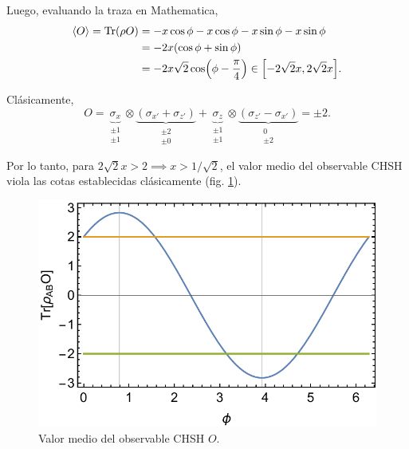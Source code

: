 \documentclass{scrartcl}
\DeclareRobustCommand{\[}{\begin{equation}}
\DeclareRobustCommand{\]}{\end{equation}}
\begin{document}
\begin{enumerate}
\begin{enumerate}
        Luego, evaluando la traza en Mathematica,
        \begin{align}
            \expval{O} = \Tr(\rho O) &= -x \cos\phi - x \cos\phi - x \sin\phi - x \sin\phi \\
                &= -2x(\cos\phi + \sin\phi) \\
                &= -2x\sqrt{2} \cos(\phi - \frac{\pi}{4}) \in \qty[-2\sqrt{2} x, 2\sqrt{2} x].
        \end{align}
        
        Clásicamente,
        \[ O = \underbrace{\sigma_x}_{\begin{array}{c} \pm 1 \\ \pm 1 \end{array}} \otimes \underbrace{(\sigma_{x'} + \sigma_{z'})}_{\begin{array}{c} \pm 2 \\ \pm 0 \end{array}} + \underbrace{\sigma_z}_{\begin{array}{c} \pm 1 \\ \pm 1 \end{array}} \otimes \underbrace{(\sigma_{z'} - \sigma_{x'})}_{\begin{array}{c} 0 \\ \pm 2 \end{array}} = \pm 2. \]
        
        Por lo tanto, para $2\sqrt{2} x > 2 \implies x > 1/\sqrt{2}$, el valor medio del observable CHSH viola las cotas establecidas clásicamente (fig. \ref{fig:II_2_c}).
        \begin{figure}[t]
            \centering
            \includegraphics[width=.5\linewidth]{Images/CHSH_plot.pdf}
            \caption{Valor medio del observable CHSH $O$.}
            \label{fig:II_2_c}
        \end{figure}
        

\end{enumerate}
\end{enumerate}
\end{document}
